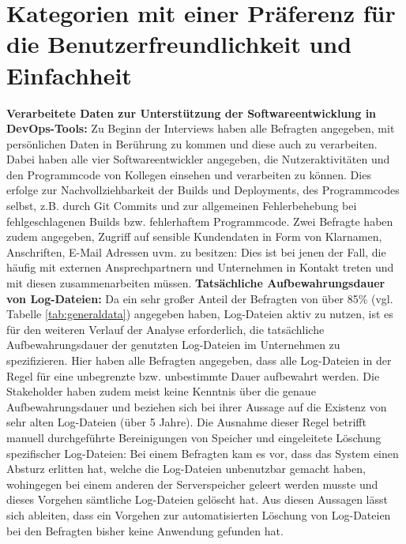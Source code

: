 \section{Kategorien mit einer Präferenz für die Benutzerfreundlichkeit und Einfachheit} \label{noprivacy}
\textbf{Verarbeitete Daten zur Unterstützung der Softwareentwicklung in DevOps-Tools:} \newline
Zu Beginn der Interviews haben alle Befragten angegeben, mit persönlichen Daten in Berührung zu kommen und diese auch zu verarbeiten. Dabei haben alle vier Softwareentwickler angegeben, die Nutzeraktivitäten und den Programmcode von Kollegen 
einsehen und verarbeiten zu können. Dies erfolge zur Nachvollziehbarkeit der Builds und Deployments, des Programmcodes selbst, z.B. durch Git Commits und zur allgemeinen Fehlerbehebung bei fehlgeschlagenen Builds bzw. fehlerhaftem Programmcode. 
Zwei Befragte haben zudem angegeben, Zugriff auf sensible Kundendaten in Form von Klarnamen, Anschriften, E-Mail Adressen uvm. zu besitzen: Dies ist bei jenen der Fall, die häufig mit externen Ansprechpartnern und Unternehmen in Kontakt treten 
und mit diesen zusammenarbeiten müssen. \newline \newline
\textbf{Tatsächliche Aufbewahrungsdauer von Log-Dateien:} \newline
Da ein sehr großer Anteil der Befragten von über 85\% (vgl. Tabelle \ref{tab:generaldata}) angegeben haben, Log-Dateien aktiv zu nutzen, ist es für den weiteren Verlauf der Analyse erforderlich, die tatsächliche Aufbewahrungsdauer der genutzten Log-Dateien 
im Unternehmen zu spezifizieren. Hier haben alle Befragten angegeben, dass alle Log-Dateien in der Regel für eine unbegrenzte bzw. unbestimmte Dauer aufbewahrt werden. Die Stakeholder haben zudem meist keine Kenntnis über die genaue Aufbewahrungsdauer und 
beziehen sich bei ihrer Aussage auf die Existenz von sehr alten Log-Dateien (über 5 Jahre). Die Ausnahme dieser Regel betrifft manuell durchgeführte Bereinigungen von Speicher und eingeleitete Löschung spezifischer Log-Dateien: Bei einem Befragten kam es vor,
dass das System einen Absturz erlitten hat, welche die Log-Dateien unbenutzbar gemacht haben, wohingegen bei einem anderen der Serverspeicher geleert werden musste und dieses Vorgehen sämtliche Log-Dateien gelöscht hat. \newline Aus diesen Aussagen lässt sich 
ableiten, dass ein Vorgehen zur automatisierten Löschung von Log-Dateien bei den Befragten bisher keine Anwendung gefunden hat. \newline \newline
